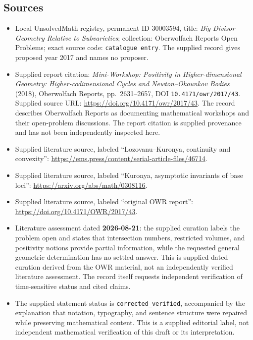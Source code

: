 \documentclass[11pt]{article}
\begin{document}
\subsection{Sources}
\begin{itemize}
\item Local UnsolvedMath registry, permanent ID \(30003594\), title: \emph{Big Divisor Geometry Relative to Subvarieties}; collection: Oberwolfach Reports Open Problems; exact source code: \texttt{catalogue entry}. The supplied record gives proposed year 2017 and names no proposer.
\item Supplied report citation: \emph{Mini-Workshop: Positivity in Higher-dimensional Geometry: Higher-codimensional Cycles and Newton--Okounkov Bodies} (2018), Oberwolfach Reports, pp.\ 2631--2657, DOI \texttt{10.4171/owr/2017/43}. Supplied source URL: \url{https://doi.org/10.4171/owr/2017/43}. The record describes Oberwolfach Reports as documenting mathematical workshops and their open-problem discussions. The report citation is supplied provenance and has not been independently inspected here.
\item Supplied literature source, labeled ``Lozovanu--Kuronya, continuity and convexity'': \url{https://ems.press/content/serial-article-files/46714}.
\item Supplied literature source, labeled ``Kuronya, asymptotic invariants of base loci'': \url{https://arxiv.org/abs/math/0308116}.
\item Supplied literature source, labeled ``original OWR report'': \url{https://doi.org/10.4171/OWR/2017/43}.
\item Literature assessment dated \textbf{2026-08-21}: the supplied curation labels the problem open and states that intersection numbers, restricted volumes, and positivity notions provide partial information, while the requested general geometric determination has no settled answer. This is supplied dated curation derived from the OWR material, not an independently verified literature assessment. The record itself requests independent verification of time-sensitive status and cited claims.
\item The supplied statement status is \texttt{corrected\_verified}, accompanied by the explanation that notation, typography, and sentence structure were repaired while preserving mathematical content. This is a supplied editorial label, not independent mathematical verification of this draft or its interpretation.
\end{itemize}
\end{document}
